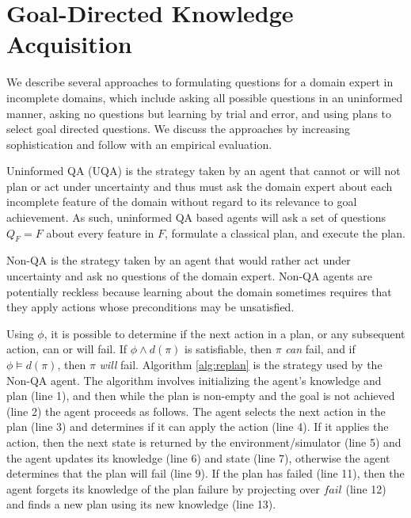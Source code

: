 \documentclass{article}
\begin{document}
\section{Goal-Directed Knowledge Acquisition}

We describe several approaches to formulating questions for a domain expert in
incomplete domains, which include asking all possible questions in an uninformed
manner, asking no questions but learning by trial and error, and using plans to
select goal directed questions. We discuss the approaches by increasing
sophistication and follow with an empirical evaluation.

 Uninformed QA (UQA) is the strategy taken by an agent that
cannot or will not plan or act under uncertainty and thus must ask the domain expert about each incomplete
feature of the domain without regard to its relevance to goal achievement.  As
such, uninformed QA based agents will ask a set of questions $Q_{F} = F$ about
every feature in $F$, formulate a classical plan, and execute the plan.

 Non-QA is the strategy taken by an agent that would rather act
under uncertainty and ask no questions of the domain expert.  Non-QA agents are
potentially reckless because learning about the domain sometimes requires that
they apply actions whose preconditions may be unsatisfied.  

Using $\phi$, it is possible to determine if the next action in a plan, or any
subsequent action, can or will fail.  If  $\phi \wedge d(\pi)$ is
satisfiable, then $\pi$ {\em can} fail, and if $\phi \models d(\pi)$,
then $\pi$ {\em will}  fail.  
Algorithm \ref{alg:replan} is the strategy used by the Non-QA agent.  The
algorithm involves initializing the agent's knowledge and plan (line 1), and then while
the plan is non-empty and the goal is not achieved (line 2) the agent proceeds
as follows.  The agent selects the next action in the plan (line 3) and
determines if it can apply the action (line 4).  If it applies the action, then
the next state is returned by the environment/simulator (line 5) and the agent
updates its knowledge (line 6) and state (line 7),
otherwise the agent determines that the plan will fail (line 9).  If the plan
has failed (line 11), then the agent forgets its knowledge of the plan failure
by projecting over $fail$ (line 12) and finds a new plan using its new knowledge
(line 13).
\end{document}
